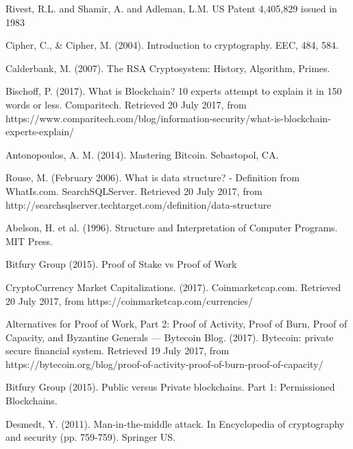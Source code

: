 \begin{thebibliography}{99}




Rivest, R.L. and Shamir, A. and Adleman, L.M. US Patent 4,405,829 issued in 1983

Cipher, C., \& Cipher, M. (2004). Introduction to cryptography. EEC, 484, 584.


Calderbank, M. (2007). The RSA Cryptosystem: History, Algorithm, Primes.


Bischoff, P. (2017). What is Blockchain? 10 experts attempt to explain it in 150 words or less. Comparitech. Retrieved 20 July 2017, from https://www.comparitech.com/blog/information-security/what-is-blockchain-experts-explain/

{\sc Antonopoulos, A. M.} (2014).
Mastering Bitcoin.
{\em} Sebastopol, CA.

Rouse, M. (February 2006). What is data structure? - Definition from WhatIs.com. SearchSQLServer. Retrieved 20 July 2017, from http://searchsqlserver.techtarget.com/definition/data-structure

{\sc Abelson, H. et al.} (1996).
Structure and Interpretation of Computer Programs.
MIT Press.

Bitfury Group (2015). Proof of Stake vs Proof of Work

CryptoCurrency Market Capitalizations. (2017). Coinmarketcap.com. Retrieved 20 July 2017, from https://coinmarketcap.com/currencies/

Alternatives for Proof of Work, Part 2: Proof of Activity, Proof of Burn, Proof of Capacity, and Byzantine Generals — Bytecoin Blog. (2017). Bytecoin: private secure financial system. Retrieved 19 July 2017, from https://bytecoin.org/blog/proof-of-activity-proof-of-burn-proof-of-capacity/

Bitfury Group (2015). Public versus Private blockchains. Part 1: Permissioned Blockchains.

Desmedt, Y. (2011). Man-in-the-middle attack. In Encyclopedia of cryptography and security (pp. 759-759). Springer US.


\end{thebibliography}
